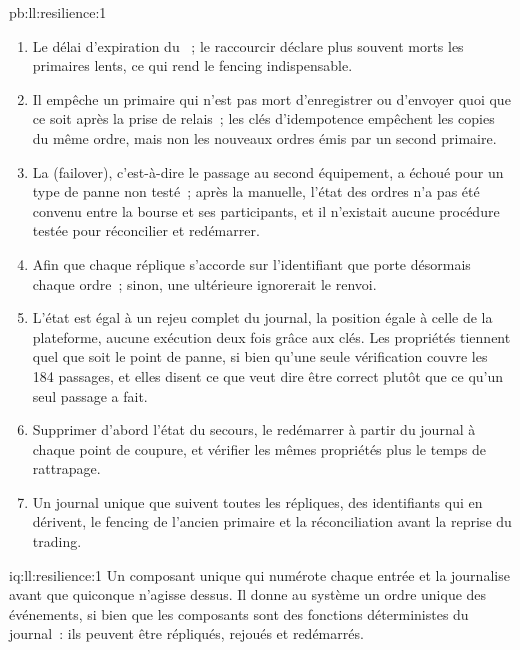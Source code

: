 \begin{solution}{pb:ll:resilience:1}
\begin{enumerate}
184 points de coupure (tout ordre exécuté, chaque fois que la panne tombait entre son départ et son compte rendu), soit environ 1.8~\% des pannes
survenant à un instant quelconque du scénario, portant la position à 1\,100 face à une limite de 1\,000~; avec clés d'idempotence, aucun~; et
la reprise a pris de 2.8 à \qty{3.1}{\milli\second}, presque entièrement dû au délai d'expiration du .
\item Le délai d'expiration du ~; le raccourcir déclare plus souvent morts les primaires lents, ce qui rend le fencing indispensable.
\item Il empêche un primaire qui n'est pas mort d'enregistrer ou d'envoyer quoi que ce soit après la prise de relais~; les clés d'idempotence empêchent les copies
du même ordre, mais non les nouveaux ordres émis par un second primaire.
\item La  (failover), c'est-à-dire le passage au second équipement, a échoué pour un type de panne non testé~; après la  manuelle, l'état
des ordres n'a pas été convenu entre la bourse et ses participants, et il n'existait aucune procédure testée pour réconcilier et
redémarrer.
\item Afin que chaque réplique s'accorde sur l'identifiant que porte désormais chaque ordre~; sinon, une  ultérieure ignorerait le
renvoi.
\item L'état est égal à un rejeu complet du journal, la position égale à celle de la plateforme, aucune exécution deux fois grâce aux clés. Les propriétés tiennent
quel que soit le point de panne, si bien qu'une seule vérification couvre les 184 passages, et elles disent ce que veut dire être correct plutôt que ce qu'un seul passage a fait.
\item Supprimer d'abord l'état du secours, le redémarrer à partir du journal à chaque point de coupure, et vérifier les mêmes propriétés plus le
temps de rattrapage.
\item Un journal unique que suivent toutes les répliques, des identifiants qui en dérivent, le fencing de l'ancien primaire et la réconciliation avant
la reprise du trading.
\end{enumerate}
\end{solution}

\begin{solution}{iq:ll:resilience:1}
Un composant unique qui numérote chaque entrée et la journalise avant que quiconque n'agisse dessus. Il donne au système un ordre unique des événements,
si bien que les composants sont des fonctions déterministes du journal~: ils peuvent être répliqués, rejoués et redémarrés.
\end{solution}

